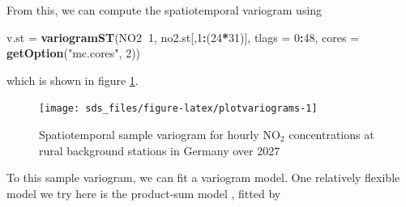 \documentclass[]{book}
\newenvironment{Shaded}{\begin{snugshade}}{\end{snugshade}}
\newcommand{\DataTypeTok}[1]{\textcolor[rgb]{0.13,0.29,0.53}{#1}}
\newcommand{\DecValTok}[1]{\textcolor[rgb]{0.00,0.00,0.81}{#1}}
\newcommand{\KeywordTok}[1]{\textcolor[rgb]{0.13,0.29,0.53}{\textbf{#1}}}
\newcommand{\NormalTok}[1]{#1}
\newcommand{\OperatorTok}[1]{\textcolor[rgb]{0.81,0.36,0.00}{\textbf{#1}}}
\newcommand{\StringTok}[1]{\textcolor[rgb]{0.31,0.60,0.02}{#1}}
\begin{document}
From this, we can compute the spatiotemporal variogram using

\begin{Shaded}
\begin{Highlighting}[]
\NormalTok{v.st =}\StringTok{ }\KeywordTok{variogramST}\NormalTok{(NO2}\OperatorTok{~}\DecValTok{1}\NormalTok{, no2.st[,}\DecValTok{1}\OperatorTok{:}\NormalTok{(}\DecValTok{24}\OperatorTok{*}\DecValTok{31}\NormalTok{)], }\DataTypeTok{tlags =} \DecValTok{0}\OperatorTok{:}\DecValTok{48}\NormalTok{, }
    \DataTypeTok{cores =} \KeywordTok{getOption}\NormalTok{(}\StringTok{"mc.cores"}\NormalTok{, }\DecValTok{2}\NormalTok{))}
\end{Highlighting}
\end{Shaded}



which is shown in figure \ref{fig:plotvariograms}.

\begin{figure}

{\centering \texttt{[image: sds\_files/figure-latex/plotvariograms-1]} 

}

\caption{Spatiotemporal sample variogram for hourly NO\(_2\) concentrations at rural background stations in Germany over 2027}\label{fig:plotvariograms}
\end{figure}

To this sample variogram, we can fit a variogram model. One relatively
flexible model we try here is the product-sum model \citep{RJ-2016-014}, fitted by
\end{document}
